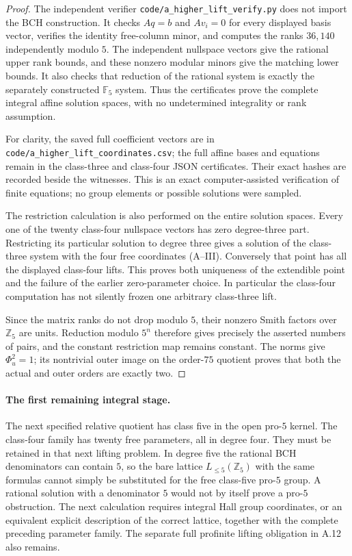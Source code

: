 \begin{proof}
The independent verifier
\texttt{code/a\_higher\_lift\_verify.py} does not import
the BCH construction. It checks $Aq=b$ and $Av_i=0$
for every displayed basis vector, verifies the
identity free-column minor, and computes the ranks
$36,140$ independently modulo $5$.
The independent nullspace vectors give the rational
upper rank bounds, and these nonzero modular minors
give the matching lower bounds. It also checks
that reduction of the rational system is exactly
the separately constructed $\mathbb F_5$ system.
Thus the certificates prove the complete integral
affine solution spaces, with no undetermined
integrality or rank assumption.

For clarity, the saved full coefficient vectors
are in
\texttt{code/a\_higher\_lift\_coordinates.csv};
the full affine bases and equations remain in the
class-three and class-four JSON certificates.
Their exact hashes are recorded beside the witnesses.
This is an exact computer-assisted verification of
finite equations; no group elements or possible
solutions were sampled.

The restriction calculation is also performed on
the entire solution spaces. Every one of the
twenty class-four nullspace vectors has zero
degree-three part. Restricting its particular
solution to degree three gives a solution of the
class-three system with the four free coordinates
(A--III). Conversely that point has all the
displayed class-four lifts. This proves both
uniqueness of the extendible point and the failure
of the earlier zero-parameter choice. In
particular the class-four computation has not
silently frozen one arbitrary class-three lift.

Since the matrix ranks do not drop modulo $5$,
their nonzero Smith factors over $\mathbb Z_5$
are units. Reduction modulo $5^n$ therefore gives
precisely the asserted numbers of pairs, and the
constant restriction map remains constant.
The norms give $\Phi_u^2=1$; its nontrivial outer
image on the order-$75$ quotient proves that both
the actual and outer orders are exactly two.
\end{proof}

\paragraph{The first remaining integral stage.}
The next specified relative quotient has class five
in the open pro-$5$ kernel. The class-four family
has twenty free parameters, all in degree four.
They must be retained in that next lifting problem.
In degree five the rational BCH denominators can
contain $5$, so the bare lattice
$L_{\leq5}(\mathbb Z_5)$ with the same formulas
cannot simply be substituted for the free
class-five pro-$5$ group. A rational solution
with a denominator $5$ would not by itself prove
a pro-$5$ obstruction. The next calculation
requires integral Hall group coordinates, or an
equivalent explicit description of the correct
lattice, together with the complete preceding
parameter family. The separate full profinite
lifting obligation in A.12 also remains.
